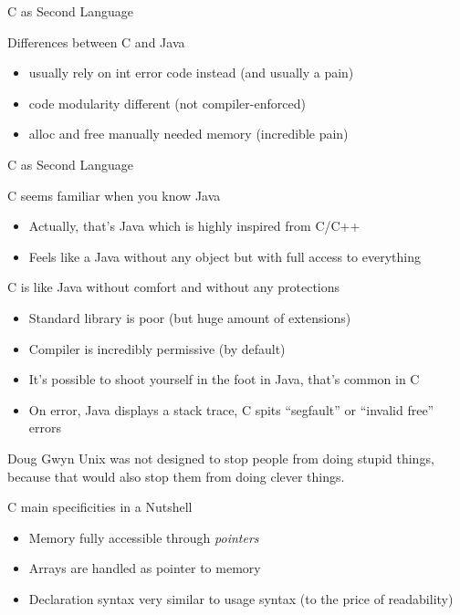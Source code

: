\begin{frame}{C as Second Language}
  \begin{block}{Differences between C and Java}
    \begin{itemize}
    \item {} usually rely on int error code instead 
      {\small(and usually a pain)}
    \item {} code modularity different
      {\small(not compiler-enforced)}
    \item {} alloc and free manually needed
      memory {\small(incredible pain)}
    \end{itemize}
  \end{block}
\end{frame}
\begin{frame}[squeeze]{C as Second Language}
  \begin{block}{C seems familiar when you know Java}
    \begin{itemize}
    \item Actually, that's Java which is highly inspired from C/C++
    \item Feels like a Java without any object but with full access to
      everything 
    \end{itemize}
  \end{block}

  \begin{block}{C is like Java without comfort and without any protections}
    \begin{itemize}
    \item Standard library is poor (but huge amount of extensions)
    \item Compiler is incredibly permissive (by default)
    \item It's possible to shoot yourself in the foot in Java, that's common in
      C
    \item On error, Java displays a stack trace, C spits ``segfault'' or
      ``invalid free'' errors
    \end{itemize}
  \end{block}
  
  \begin{boitequote}{Doug Gwyn}
    Unix was not designed to stop people from doing stupid things, because
    that would also stop them from doing clever things.
  \end{boitequote}
  \begin{block}{C main specificities in a Nutshell}
    \begin{itemize}
    \item Memory fully accessible through \textit{pointers}
    \item Arrays are handled as pointer to memory
    \item Declaration syntax very similar to usage syntax (to the price of
      readability)
    \end{itemize}
  \end{block}
\end{frame}
